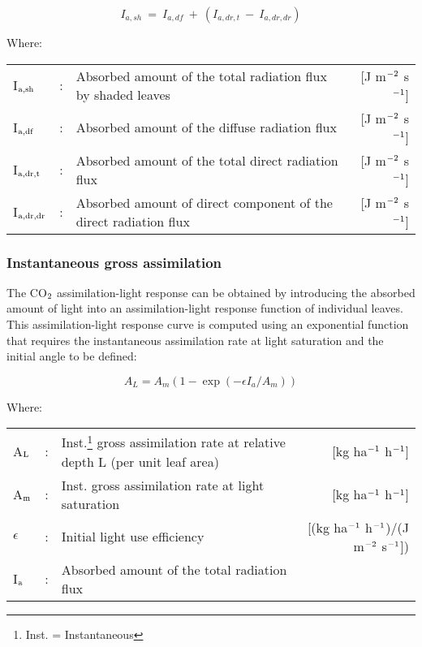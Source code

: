 \begin{equation}
\label{eq:5.22}
I _{a,sh} ~=~ I _{a,df} ~+~ (I_{a,dr,t} ~-~ I_{a,dr,dr} )
\end{equation}

Where:\\[5pt]
\begin{tabularx}{\textwidth}{llXr}
	I$_{{\rm a,sh}}$ &:& Absorbed amount of the total radiation flux by shaded leaves
	&    [J m$^{{\rm -2}}$ s$^{{\rm -1}}$]\\
	I$_{{\rm a,df}}$ &:& Absorbed amount of the diffuse radiation flux
	&     [J m$^{{\rm -2}}$ s$^{{\rm -1}}$]\\
	I$_{{\rm a,dr,t}}$ &:& Absorbed amount of the total direct radiation flux
	&     [J m$^{{\rm -2}}$ s$^{{\rm -1}}$]\\
	I$_{{\rm a,dr,dr}}$ &:& Absorbed amount of direct component of the  direct radiation flux
	& [J m$^{{\rm -2}}$ s$^{{\rm -1}}$]\\
\end{tabularx}


\subsubsection{Instantaneous gross assimilation}
The CO$_{{\rm 2}}$ assimilation-light response can be obtained by introducing the absorbed amount
of light into an assimilation-light response function of individual leaves. This assimilation-light
response curve is computed using an exponential function that requires the instantaneous assimilation 
rate at light saturation and the initial angle to be defined:

\begin{equation}
\label{eq:5.23}
A_{L} = A_{m} (1-\exp({{-\epsilon I_{a}}/{A_{m}}}))
\end{equation}

Where:\\[5pt]
\begin{tabularx}{\textwidth}{llXr}
	A$_{{\rm L}}$ &:& Inst.\footnote{ Inst. = Instantaneous} gross assimilation 
	rate at relative depth L (per unit leaf area)    &    
	[kg ha$^{{\rm -1}}$ h$^{{\rm -1}}$]\\
	A$_{{\rm m}}$ &:& Inst. gross assimilation rate at light saturation    & 
	[kg ha$^{{\rm -1}}$ h$^{{\rm -1}}$]\\
	$\epsilon$ &:& Initial light use efficiency   &   [(kg ha$^{{\rm -1}}$ 
	h$^{{\rm -1}}$)/(J m$^{{\rm -2}}$ s$^{{\rm -1}}$])\\
	I$_{{\rm a}}$ &:& Absorbed amount of the total radiation flux     &   
\end{tabularx}

